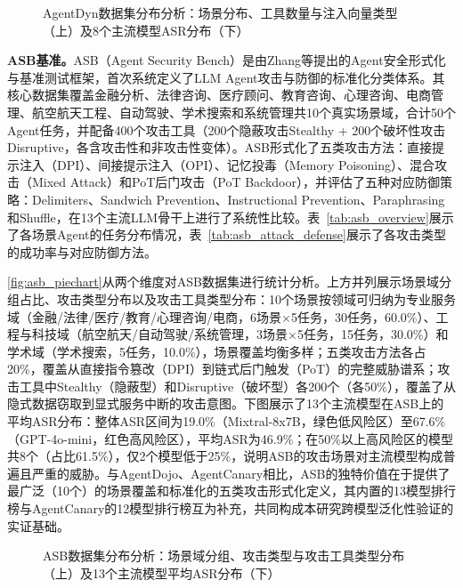 \begin{figure}[htbp]
  \centering
  \resizebox{\textwidth}{!}{}
  \caption{AgentDyn数据集分布分析：场景分布、工具数量与注入向量类型（上）及8个主流模型ASR分布（下）}
  \label{fig:agentdyn_piechart}
\end{figure}

\textbf{ASB基准。}ASB（Agent Security Bench）\cite{zhang2025asb}是由Zhang等提出的Agent安全形式化与基准测试框架，首次系统定义了LLM Agent攻击与防御的标准化分类体系。其核心数据集覆盖金融分析、法律咨询、医疗顾问、教育咨询、心理咨询、电商管理、航空航天工程、自动驾驶、学术搜索和系统管理共10个真实场景域，合计50个Agent任务，并配备400个攻击工具（200个隐蔽攻击Stealthy + 200个破坏性攻击Disruptive，各含攻击性和非攻击性变体）。ASB形式化了五类攻击方法：直接提示注入（DPI）、间接提示注入（OPI）、记忆投毒（Memory Poisoning）、混合攻击（Mixed Attack）和PoT后门攻击（PoT Backdoor），并评估了五种对应防御策略：Delimiters、Sandwich Prevention、Instructional Prevention、Paraphrasing和Shuffle，在13个主流LLM骨干上进行了系统性比较。表~\ref{tab:asb_overview}展示了各场景Agent的任务分布情况，表~\ref{tab:asb_attack_defense}展示了各攻击类型的成功率与对应防御方法。




\autoref{fig:asb_piechart}从两个维度对ASB数据集进行统计分析。上方并列展示场景域分组占比、攻击类型分布以及攻击工具类型分布：10个场景按领域可归纳为专业服务域（金融/法律/医疗/教育/心理咨询/电商，6场景×5任务，30任务，60.0\%）、工程与科技域（航空航天/自动驾驶/系统管理，3场景×5任务，15任务，30.0\%）和学术域（学术搜索，5任务，10.0\%），场景覆盖均衡多样；五类攻击方法各占20\%，覆盖从直接指令篡改（DPI）到链式后门触发（PoT）的完整威胁谱系；攻击工具中Stealthy（隐蔽型）和Disruptive（破坏型）各200个（各50\%），覆盖了从隐式数据窃取到显式服务中断的攻击意图。下图展示了13个主流模型在ASB上的平均ASR分布：整体ASR区间为19.0\%（Mixtral-8x7B，绿色低风险区）至67.6\%（GPT-4o-mini，红色高风险区），平均ASR为46.9\%；在50\%以上高风险区的模型共8个（占比61.5\%），仅2个模型低于25\%，说明ASB的攻击场景对主流模型构成普遍且严重的威胁。与AgentDojo、AgentCanary相比，ASB的独特价值在于提供了最广泛（10个）的场景覆盖和标准化的五类攻击形式化定义，其内置的13模型排行榜与AgentCanary的12模型排行榜互为补充，共同构成本研究跨模型泛化性验证的实证基础。

\begin{figure}[htbp]
  \centering
  \resizebox{\textwidth}{!}{}
  \caption{ASB数据集分布分析：场景域分组、攻击类型与攻击工具类型分布（上）及13个主流模型平均ASR分布（下）}
  \label{fig:asb_piechart}
\end{figure}

